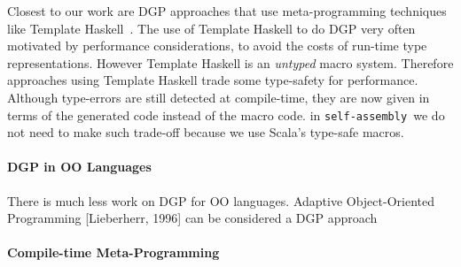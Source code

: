 \documentclass[preprint]{sigplanconf}
\newcommand{\selfassembly}{\texttt{self-assembly~}}
\begin{document}
Closest to our work are DGP approaches that use meta-programming
techniques like Template Haskell~\cite{TemplateYourBoilerplate}. 
The use of Template Haskell to do
DGP very often motivated by performance considerations, to avoid the
costs of run-time type representations. However Template Haskell is an 
\emph{untyped} macro system. Therefore approaches using Template
Haskell trade some type-safety for performance. Although type-errors
are still detected at compile-time, they are now given in terms of the 
generated code instead of the macro code. in \selfassembly we do not
need to make such trade-off because we use Scala's type-safe macros.

\paragraph{DGP in OO Languages} There is much less work on DGP for 
OO languages. Adaptive Object-Oriented Programming [Lieberherr, 1996]
can be considered a DGP approach

\paragraph{Compile-time Meta-Programming}



\cite{TemplateYourBoilerplate}
\cite{Pickling}
\cite{SYB}









% 




\end{document}
